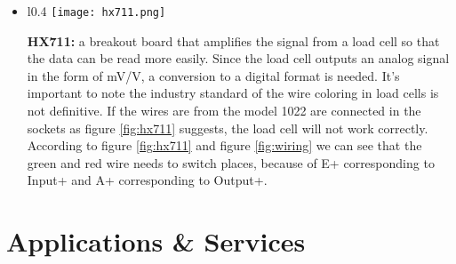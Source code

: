 \begin{itemize}
  \item 
    \parbox[t]{\dimexpr\textwidth-\leftmargin}{%
    \vspace{-2.5mm}
    \begin{wrapfigure}{l}{0.4\textwidth}
      \centering
      \vspace{-\baselineskip}
      \texttt{[image: hx711.png]}
      \caption{HX711\cite{hx711-shop}}
      \label{fig:hx711}
    \end{wrapfigure}
    \textbf{HX711:} a breakout board that amplifies the signal from a load cell so that the data can be read more easily. Since the load cell outputs an analog signal in the form of mV/V, a conversion to a digital format is needed. It's important to note the industry standard of the wire coloring in load cells is not definitive.\cite{load-cell-wiring-standard} If the wires are from the model 1022 are connected in the sockets as figure \ref{fig:hx711} suggests, the load cell will not work correctly. According to figure \ref{fig:hx711} and figure \ref{fig:wiring} we can see that the green and red wire needs to switch places, because of E+ corresponding to Input+ and A+ corresponding to Output+.
    }

\end{itemize}


\section{Applications \& Services}
\lipsum[2]
